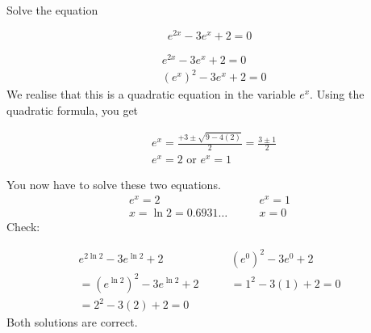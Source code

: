 \begin{example} Solve the equation

\[
e^{2 x}-3 e^x+2=0
\]

\begin{solution}

\[
\begin{aligned}
& e^{2 x}-3 e^x+2=0 \\
& \left(e^x\right)^2-3 e^x+2=0
\end{aligned}
\]
We realise that this is a quadratic equation in the variable $e^x$. Using the quadratic formula, you get

\[
\begin{aligned}
& e^x=\frac{+3 \pm \sqrt{9-4(2)}}{2}=\frac{3 \pm 1}{2} \\
& e^x=2 \text { or } e^x=1
\end{aligned}
\]


You now have to solve these two equations.
\[
\begin{array}{ll}
e^x=2 & \qquad e^x=1 \\
x=\ln 2=0.6931 \ldots & \qquad x=0
\end{array}
\]
Check:

\[
\begin{array}{ll}
e^{2 \ln 2}-3 e^{\ln 2}+2 & \qquad \left(e^0\right)^2-3 e^0+2 \\
=\left(e^{\ln 2}\right)^2-3 e^{\ln 2}+2 & \qquad =1^2-3(1)+2=0 \\
=2^2-3(2)+2=0 &
\end{array}
\]
Both solutions are correct.
\end{solution}  
\end{example}

\newpage

